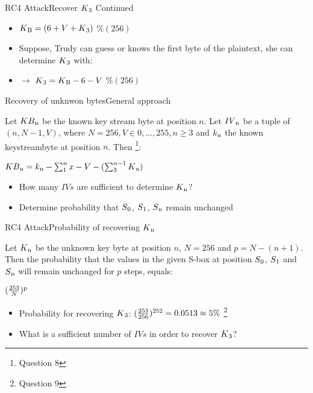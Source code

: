 \documentclass[
	aspectratio=169,	%
	onlytextwidth,		%
	t					%
	]{beamer}
\begin{document}
\begin{frame}[fragile]{RC4 Attack}{Recover $K\textsubscript{3}$ Continued}

	\begin{itemize}
		\item $K\textsubscript{B} = (6 + V + K\textsubscript{3})$ $\% (256)$
		\item Suppose, Trudy can guess or knows the first byte of the plaintext, she can determine $K\textsubscript{3}$ with:
		\item $\rightarrow$ $K\textsubscript{3}  = K\textsubscript{B} - 6 - V$ $\% (256)$
	\end{itemize}
\end{frame}

\begin{frame}[fragile]{Recovery of unknwon bytes}{General approach} 
	\begin{definition}
		Let $KB\textsubscript{n} $ be the known key stream byte at position $n$. Let $ IV\textsubscript{n} $ be a tuple of $ (n, N-1, V) $,
		where $ N = 256, V \in {{0,\dots,255}}, n \geq 3 $ and $ k\textsubscript{n} $ the known keystreambyte at position $n$. Then \footnote[frame]{\footnotesize Question 8}: \\
		\begin{center}
			$KB\textsubscript{n} = k\textsubscript{n} - \sum_{1}^{n}x - V - (\sum_{3}^{n-1}K\textsubscript{n})$
		\end{center}
	\end{definition} 
	\begin{itemize}[<+->]
		\item How many $IVs$ are sufficient to determine $ K\textsubscript{n} $?
		\item Determine probability that $ S\textsubscript{0}$, $S\textsubscript{1}$, $S\textsubscript{n} $ remain unchanged
	\end{itemize}
\end{frame}

\begin{frame}[fragile]{RC4 Attack}{Probability of recovering $K\textsubscript{n}$}
	\begin{definition}
		Let $K\textsubscript{n}$ be the unknown key byte at position $n$, $N=256$ and $p = N-(n+1)$. Then the probability that the values in the given S-box at position $S\textsubscript{0}$,
		$S\textsubscript{1}$ and $S\textsubscript{n}$ will remain unchanged for $p$ steps, equals:\\
		\begin{center}
			$(\frac{253}{N})\textsuperscript{p}$
		\end{center}
	\end{definition} 
	\begin{itemize}[<+->]
		\item Probability for recovering $K\textsubscript{3}$: $(\frac{253}{256})\textsuperscript{252} = 0.0513 \approx 5\%$ \footnote[frame]{\footnotesize Question 9}
		\item What is a sufficient number of $IVs$ in order to recover $K\textsubscript{3}$?
	\end{itemize}
\end{frame}
\end{document}

